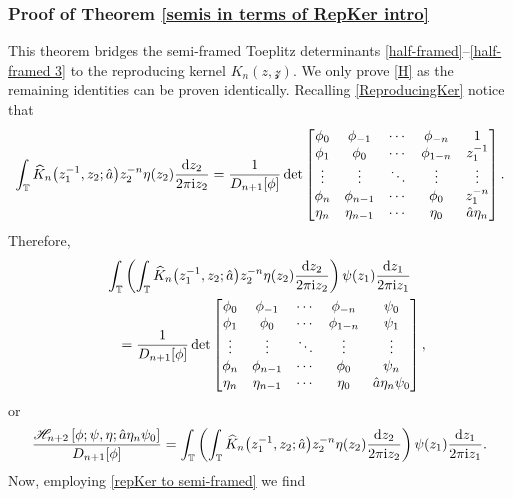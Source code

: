 \documentclass[pdftex]{sigma}
\numberwithin{equation}{section}
\newcommand{\T}{{\mathbb T}}
\newcommand{\ii}{{\rm i}}
\newcommand{\dd}{{\rm d}}
\begin{document}
\subsubsection{Proof of Theorem \ref{semis in terms of RepKer intro} }
		This theorem bridges the semi-framed Toeplitz determinants \eqref{half-framed}--\eqref{half-framed 3} to the reproducing kernel $K_n(z,\mathcal{z})$.	We only prove \eqref{H} as the remaining identities can be proven identically. Recalling \eqref{ReproducingKer} notice that
		\[
				\int_{\T} \widehat{K}_{n}\big(z^{-1}_1,z_2;\hat{a}\big) z^{-n}_2 \eta(z_2) \frac{\dd z_2}{2 \pi \ii z_2} = \frac{1}{D_{n+1}[\phi]}\det
				\begin{bmatrix}
					\phi_{0} & \phi_{-1} & \cdots & \phi_{-n} & 1\\
					\phi_{1} & \phi_{0} & \cdots & \phi_{1-n} & z^{-1}_1\\
					\vdots & \vdots & \ddots & \vdots & \vdots\\
					\phi_{n} & \phi_{n-1} & \cdots & \phi_{0} & z_1^{-n} \\
					\eta_n & \eta_{n-1} & \cdots & \eta_0 & \hat{a} \eta_n
				\end{bmatrix}.
		\]
		Therefore,
		\begin{gather*}
				\int_{\T} \left(\int_{\T} \widehat{K}_{n}\big(z^{-1}_1,z_2;\hat{a}\big) z^{-n}_2 \eta(z_2) \frac{\dd z_2}{2 \pi \ii z_2} \right) \psi(z_1) \frac{\dd z_1}{2 \pi \ii z_1} \\
\qquad = \frac{1}{D_{n+1}[\phi]}\det
				\begin{bmatrix}
					\phi_{0} & \phi_{-1} & \cdots & \phi_{-n} & \psi_{0}\\
					\phi_{1} & \phi_{0} & \cdots & \phi_{1-n} & \psi_{1}\\
					\vdots & \vdots & \ddots & \vdots & \vdots\\
					\phi_{n} & \phi_{n-1} & \cdots & \phi_{0} & \psi_{n} \\
					\eta_n & \eta_{n-1} & \cdots & \eta_0 & \hat{a} \eta_n \psi_{0}
				\end{bmatrix},
		\end{gather*}
		or
		\begin{equation*} \frac{\mathscr{H}_{n+2}\left[\phi; \psi, \eta ;\hat{a} \eta_n \psi_{0}\right]}{D_{n+1}[\phi]} = \int_{\T} \left(\int_{\T} \widehat{K}_{n}\big(z^{-1}_1,z_2;\hat{a}\big) z^{-n}_2 \eta(z_2) \frac{\dd z_2}{2 \pi \ii z_2} \right) \psi(z_1) \frac{\dd z_1}{2 \pi \ii z_1}.
		\end{equation*}
		Now, employing \eqref{repKer to semi-framed} we find
\end{document}

